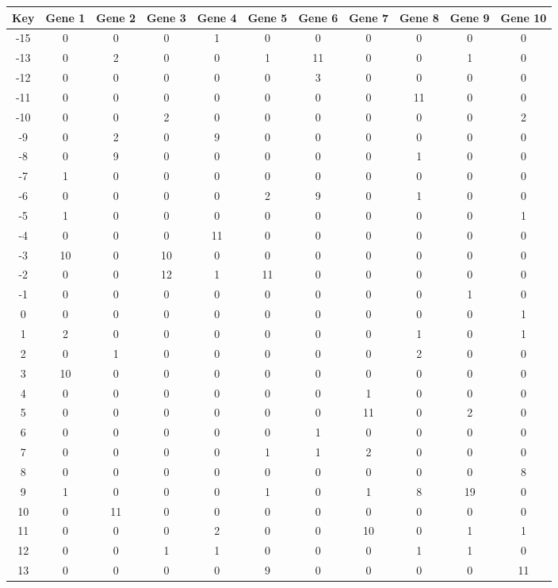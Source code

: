 \begin{tabular}{|c|c|c|c|c|c|c|c|c|c|c|}
\hline
Key & Gene 1 & Gene 2 & Gene 3 & Gene 4 & Gene 5 & Gene 6 & Gene 7 & Gene 8 & Gene 9 & Gene 10 \\
\hline
-15 & 0 & 0 & 0 & 1 & 0 & 0 & 0 & 0 & 0 & 0 \\
-13 & 0 & 2 & 0 & 0 & 1 & 11 & 0 & 0 & 1 & 0 \\
-12 & 0 & 0 & 0 & 0 & 0 & 3 & 0 & 0 & 0 & 0 \\
-11 & 0 & 0 & 0 & 0 & 0 & 0 & 0 & 11 & 0 & 0 \\
-10 & 0 & 0 & 2 & 0 & 0 & 0 & 0 & 0 & 0 & 2 \\
-9 & 0 & 2 & 0 & 9 & 0 & 0 & 0 & 0 & 0 & 0 \\
-8 & 0 & 9 & 0 & 0 & 0 & 0 & 0 & 1 & 0 & 0 \\
-7 & 1 & 0 & 0 & 0 & 0 & 0 & 0 & 0 & 0 & 0 \\
-6 & 0 & 0 & 0 & 0 & 2 & 9 & 0 & 1 & 0 & 0 \\
-5 & 1 & 0 & 0 & 0 & 0 & 0 & 0 & 0 & 0 & 1 \\
-4 & 0 & 0 & 0 & 11 & 0 & 0 & 0 & 0 & 0 & 0 \\
-3 & 10 & 0 & 10 & 0 & 0 & 0 & 0 & 0 & 0 & 0 \\
-2 & 0 & 0 & 12 & 1 & 11 & 0 & 0 & 0 & 0 & 0 \\
-1 & 0 & 0 & 0 & 0 & 0 & 0 & 0 & 0 & 1 & 0 \\
0 & 0 & 0 & 0 & 0 & 0 & 0 & 0 & 0 & 0 & 1 \\
1 & 2 & 0 & 0 & 0 & 0 & 0 & 0 & 1 & 0 & 1 \\
2 & 0 & 1 & 0 & 0 & 0 & 0 & 0 & 2 & 0 & 0 \\
3 & 10 & 0 & 0 & 0 & 0 & 0 & 0 & 0 & 0 & 0 \\
4 & 0 & 0 & 0 & 0 & 0 & 0 & 1 & 0 & 0 & 0 \\
5 & 0 & 0 & 0 & 0 & 0 & 0 & 11 & 0 & 2 & 0 \\
6 & 0 & 0 & 0 & 0 & 0 & 1 & 0 & 0 & 0 & 0 \\
7 & 0 & 0 & 0 & 0 & 1 & 1 & 2 & 0 & 0 & 0 \\
8 & 0 & 0 & 0 & 0 & 0 & 0 & 0 & 0 & 0 & 8 \\
9 & 1 & 0 & 0 & 0 & 1 & 0 & 1 & 8 & 19 & 0 \\
10 & 0 & 11 & 0 & 0 & 0 & 0 & 0 & 0 & 0 & 0 \\
11 & 0 & 0 & 0 & 2 & 0 & 0 & 10 & 0 & 1 & 1 \\
12 & 0 & 0 & 1 & 1 & 0 & 0 & 0 & 1 & 1 & 0 \\
13 & 0 & 0 & 0 & 0 & 9 & 0 & 0 & 0 & 0 & 11 \\
\hline
\end{tabular}